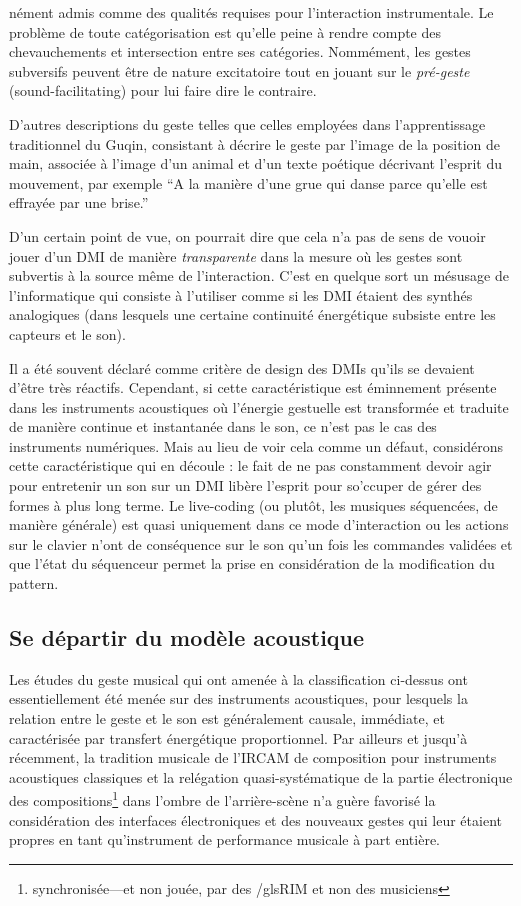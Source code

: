 nément admis comme des qualités requises pour l'interaction instrumentale.
Le problème de toute catégorisation est qu'elle peine à rendre compte des chevauchements et intersection entre ses catégories. Nommément, les gestes subversifs peuvent être de nature excitatoire tout en jouant sur le \textit{pré-geste} (sound-facilitating) pour lui faire dire le contraire.

D'autres descriptions du geste telles que celles employées dans l'apprentissage traditionnel du Guqin, consistant à décrire le geste par l'image de la position de main, associée à l'image d'un animal et d'un texte poétique décrivant l'esprit du mouvement, par exemple ``A la manière d'une grue qui danse parce qu'elle est effrayée par une brise.''

D'un certain point de vue, on pourrait dire que cela n'a pas de sens de vouoir jouer d'un DMI de manière \textit{transparente} dans la mesure où les gestes sont subvertis à la source même de l'interaction. C'est en quelque sort un mésusage de l'informatique qui consiste à l'utiliser comme si les DMI étaient des synthés analogiques (dans lesquels une certaine continuité énergétique subsiste entre les capteurs et le son).


Il a été souvent déclaré comme critère de design des DMIs qu'ils se devaient d'être très réactifs. Cependant, si cette caractéristique est éminnement présente dans les instruments acoustiques où l'énergie gestuelle est transformée et traduite de manière continue et instantanée dans le son, ce n'est pas le cas des instruments numériques. Mais au lieu de voir cela comme un défaut, considérons cette caractéristique qui en découle : le fait de ne pas constamment devoir agir pour entretenir un son sur un DMI libère l'esprit pour so'ccuper de gérer des formes à plus long terme. Le live-coding (ou plutôt, les musiques séquencées, de manière générale) est quasi uniquement dans ce mode d'interaction ou les actions sur le clavier n'ont de conséquence sur le son qu'un fois les commandes validées et que l'état du séquenceur permet la prise en considération de la modification du pattern.

\subsection{Se départir du modèle acoustique}

Les études du geste musical qui ont amenée à la classification ci-dessus ont essentiellement été menée sur des instruments acoustiques, pour lesquels la relation entre le geste et le son est généralement causale, immédiate, et caractérisée par transfert énergétique proportionnel.
Par ailleurs et jusqu'à récemment, la tradition musicale de l'IRCAM de composition pour instruments acoustiques classiques et la relégation quasi-systématique de la partie électronique des compositions\footnote{synchronisée—et non jouée, par des /gls{RIM} et non des musiciens} dans l'ombre de l'arrière-scène n'a guère favorisé la considération des interfaces électroniques et des nouveaux gestes qui leur étaient propres en tant qu'instrument de performance musicale à part entière.

